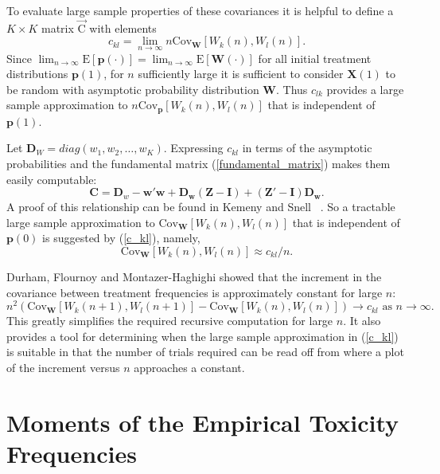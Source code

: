 To evaluate large sample properties of these covariances it is
helpful to define a $K\times K$ matrix $\vec{\textrm{C}}$ with elements
\begin{equation*}\label{c_kl}
c_{kl}=\lim_{n\rightarrow\infty}n\textrm{Cov}_{\mathbf{W}}\left[W_k(n),W_l(n)\right].
\end{equation*}
Since
$\lim_{n\rightarrow\infty}\mathrm{E}[{\mathbf{p}}(\cdot)]=\lim_{n\rightarrow\infty}
\mathrm{E}[{\mathbf{W}}(\cdot)]$
for all initial treatment distributions ${\mathbf{p}(1)}$, for $n$
sufficiently large it is sufficient to consider $\mathbf{X}(1)$ to be
random with asymptotic probability distribution $\mathbf{W}$.  Thus
$c_{lk}$ provides a large sample approximation to
$n\textrm{Cov}_{\mathbf{p}}\left[W_k(n),W_l(n)\right]$ that is
independent of $\mathbf{p}(1)$.

Let $\mathbf{D}_W=diag\left(w_1,w_2,\ldots,w_K\right)$.  Expressing
$c_{kl}$ in terms of the asymptotic probabilities and the
fundamental matrix (\ref{fundamental_matrix}) makes them easily
computable:
\begin{equation*}
\mathbf{C}=\mathbf{D}_w-\mathbf{w}'\mathbf{w}
+\mathbf{D}_{\mathbf{w}}(\mathbf{Z}-\mathbf{I})
+(\mathbf{Z}'-\mathbf{I})\mathbf{D}_{\mathbf{w}}.
\end{equation*}
A proof of this relationship can be found in Kemeny and Snell
~\cite{Keme:Snel:1960}.  So a tractable large sample
approximation to $\textrm{Cov}_{\mathbf{W}}\left[W_k(n),W_l(n)\right]$ that is
independent of $\mathbf{p}(0)$ is suggested by (\ref{c_kl}), namely,
$$\textrm{Cov}_{\mathbf{W}}\left[W_k(n),W_l(n)\right]\approx {c_{kl}}/n.$$


Durham, Flournoy and Montazer-Haghighi \cite{Durh:Flou:Mont:up-a:1993} showed that the
increment in the covariance between treatment frequencies is
approximately constant for large $n$:
\begin{equation}
n^2\left(\textrm{Cov}_{\mathbf{W}}\left[W_k(n+1),W_l(n+1)\right]
-\textrm{Cov}_{\mathbf{W}}\left[W_k(n),W_l(n)\right]\right)
\rightarrow c_{kl} \textrm{ as $n \rightarrow \infty$}.
\end{equation}
This greatly simplifies the required recursive computation for
large $n$.  It also provides a tool for determining when the large
sample approximation in (\ref{c_kl}) is suitable in that the
number of trials required can be read off from where a plot of the
increment versus $n$ approaches a constant.

\section{Moments of the Empirical Toxicity Frequencies}

